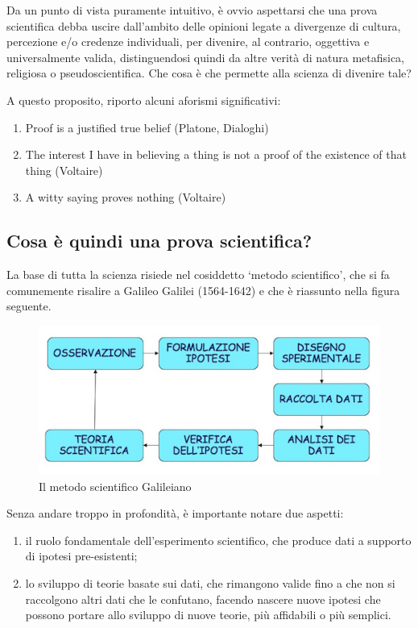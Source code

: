 \documentclass[a4paper,12pt,oneside]{book}
\providecommand{\tightlist}{%
  \setlength{\itemsep}{0pt}\setlength{\parskip}{0pt}}
\theoremstyle{definition}
\theoremstyle{definition}
\theoremstyle{definition}
\theoremstyle{remark}
\begin{document}
Da un punto di vista puramente intuitivo, è ovvio aspettarsi che una
prova scientifica debba uscire dall'ambito delle opinioni legate a
divergenze di cultura, percezione e/o credenze individuali, per
divenire, al contrario, oggettiva e universalmente valida,
distinguendosi quindi da altre verità di natura metafisica, religiosa o
pseudoscientifica. Che cosa è che permette alla scienza di divenire
tale?

A questo proposito, riporto alcuni aforismi significativi:

\begin{enumerate}
\def\labelenumi{\arabic{enumi}.}
\tightlist
\item
  Proof is a justified true belief (Platone, Dialoghi)
\item
  The interest I have in believing a thing is not a proof of the
  existence of that thing (Voltaire)
\item
  A witty saying proves nothing (Voltaire)
\end{enumerate}

\subsection{Cosa è quindi una prova
scientifica?}\label{cosa-e-quindi-una-prova-scientifica}

La base di tutta la scienza risiede nel cosiddetto `metodo scientifico',
che si fa comunemente risalire a Galileo Galilei (1564-1642) e che è
riassunto nella figura seguente.

\begin{figure}

{\centering \includegraphics[width=0.75\linewidth]{_images/MSAMap} 

}

\caption{Il metodo scientifico Galileiano}\label{fig:figName11}
\end{figure}

Senza andare troppo in profondità, è importante notare due aspetti:

\begin{enumerate}
\def\labelenumi{\arabic{enumi}.}
\tightlist
\item
  il ruolo fondamentale dell'esperimento scientifico, che produce dati a
  supporto di ipotesi pre-esistenti;
\item
  lo sviluppo di teorie basate sui dati, che rimangono valide fino a che
  non si raccolgono altri dati che le confutano, facendo nascere nuove
  ipotesi che possono portare allo sviluppo di nuove teorie, più
  affidabili o più semplici.
\end{enumerate}
\end{document}
